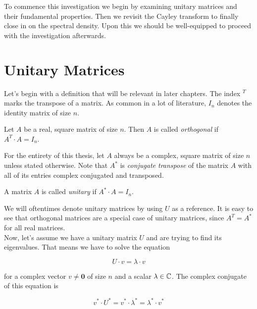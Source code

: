 To commence this investigation we begin by examining unitary matrices and their fundamental properties.
Then we revisit the Cayley transform to finally close in on the spectral density.
Upon this we should be well-equipped to proceed with the investigation afterwards.

\section{Unitary Matrices}

Let's begin with a definition that will be relevant in later chapters.
The index $^T$ marks the transpose of a matrix.
As common in a lot of literature, $I_n$ denotes the identity matrix of size $n$.

\begin{definition}
    Let $A$ be a real, square matrix of size $n$.
    Then $A$ is called \emph{orthogonal} if $A^T \cdot A = I_n$.
\end{definition}

For the entirety of this thesis, let $A$ always be a complex, square matrix of size $n$ unless stated otherwise.
Note that $A^*$ is \emph{conjugate transpose} of the matrix $A$ with all of its entries complex conjugated and transposed.

\begin{definition}
    A matrix $A$ is called \emph{unitary} if $A^* \cdot A = I_n$.
\end{definition}

We will oftentimes denote unitary matrices by using $U$ as a reference.
It is easy to see that orthogonal matrices are a special case of unitary matrices, since $A^T = A^*$ for all real matrices.\\
Now, let's assume we have a unitary matrix $U$ and are trying to find its eigenvalues.
That means we have to solve the equation

\begin{equation} \label{eq:eigenvalue_equation}
    U \cdot v = \lambda \cdot v
\end{equation}

for a complex vector $v \neq \mathbf{0}$ of size $n$ and a scalar $\lambda \in \mathbb{C}$.
The complex conjugate of this equation is

\begin{equation} \label{eq:eigenvalue_equation_complex_conjugate}
    v^* \cdot U^* = v^* \cdot \lambda^* = \lambda^* \cdot v^*
\end{equation}

